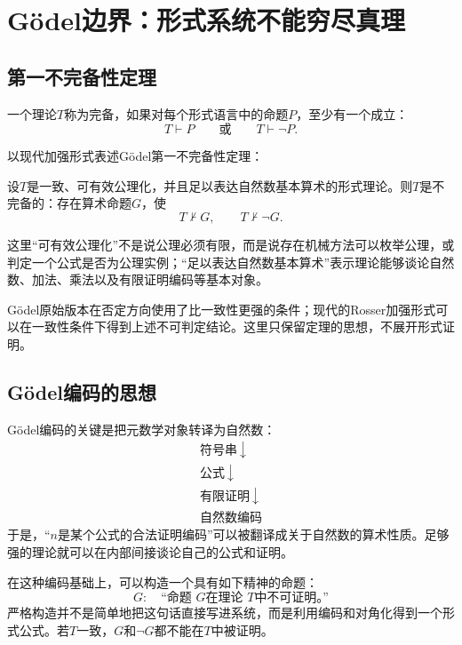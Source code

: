 
\section{Gödel边界：形式系统不能穷尽真理}

\subsection{第一不完备性定理}

一个理论$T$称为完备，如果对每个形式语言中的命题$P$，至少有一个成立：
\[
    T\vdash P
    \qquad\text{或}\qquad
    T\vdash\neg P.
\]

以现代加强形式表述Gödel第一不完备性定理：

\begin{theorem}[Gödel第一不完备性定理的形式]
设$T$是一致、可有效公理化，并且足以表达自然数基本算术的形式理论。则$T$是不完备的：存在算术命题$G$，使
\[
    T\nvdash G,
    \qquad
    T\nvdash\neg G.
\]
\end{theorem}

这里“可有效公理化”不是说公理必须有限，而是说存在机械方法可以枚举公理，或判定一个公式是否为公理实例；“足以表达自然数基本算术”表示理论能够谈论自然数、加法、乘法以及有限证明编码等基本对象。

Gödel原始版本在否定方向使用了比一致性更强的条件；现代的Rosser加强形式可以在一致性条件下得到上述不可判定结论。这里只保留定理的思想，不展开形式证明。

\subsection{Gödel编码的思想}

Gödel编码的关键是把元数学对象转译为自然数：
\[
\begin{array}{c}
\text{符号串}\
\downarrow\\
\text{公式}\
\downarrow\\
\text{有限证明}\
\downarrow\\
\text{自然数编码}
\end{array}
\]
于是，“$n$是某个公式的合法证明编码”可以被翻译成关于自然数的算术性质。足够强的理论就可以在内部间接谈论自己的公式和证明。

在这种编码基础上，可以构造一个具有如下精神的命题：
\[
    G:\quad
    \text{“命题 }G\text{在理论 }T\text{中不可证明。”}
\]
严格构造并不是简单地把这句话直接写进系统，而是利用编码和对角化得到一个形式公式。若$T$一致，$G$和$\neg G$都不能在$T$中被证明。


